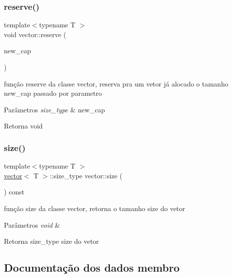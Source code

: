 \mbox{\label{classsc_1_1vector_ab3f182ffcff81ba14ecfcc9e53711496}} 
\subsubsection{\texorpdfstring{reserve()}{reserve()}}
{\footnotesize\ttfamily template$<$typename T $>$ \\
void vector\+::reserve (\begin{DoxyParamCaption}\item[{size\+\_\+type}]{new\+\_\+cap }\end{DoxyParamCaption})}

função reserve da classe vector, reserva pra um vetor já alocado o tamanho new\+\_\+cap passado por parametro 
\begin{DoxyParams}{Parâmetros}
{\em size\+\_\+type} & new\+\_\+cap \\
\hline
\end{DoxyParams}
\begin{DoxyReturn}{Retorna}
void 
\end{DoxyReturn}
\mbox{\label{classsc_1_1vector_afee521145d4c91a523a4ab3c605296a2}} 
\subsubsection{\texorpdfstring{size()}{size()}}
{\footnotesize\ttfamily template$<$typename T $>$ \\
\mbox{\hyperlink{classsc_1_1vector}{vector}}$<$ T $>$\+::size\+\_\+type vector\+::size (\begin{DoxyParamCaption}\item[{void}]{ }\end{DoxyParamCaption}) const}

função size da classe vector, retorna o tamanho size do vetor 
\begin{DoxyParams}{Parâmetros}
{\em void} & \\
\hline
\end{DoxyParams}
\begin{DoxyReturn}{Retorna}
size\+\_\+type size do vetor 
\end{DoxyReturn}


\subsection{Documentação dos dados membro}
\mbox{\label{classsc_1_1vector_a3fadfe198ea4c912fb9ce406ef366a6a}} 
